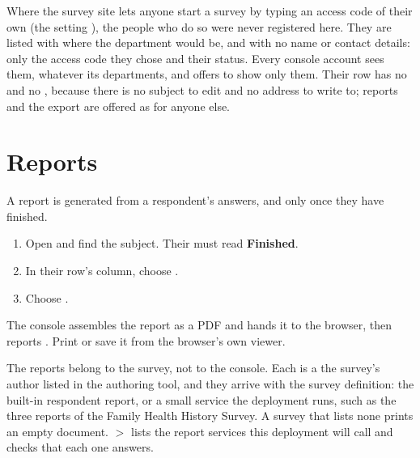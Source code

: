 \documentclass[11pt, a4paper]{article}
\begin{document}
Where the survey site lets anyone start a survey by typing an access code of their own (the
setting ), the people who do so were never registered here. They
are listed with  where the department would be, and with no name or contact
details: only the access code they chose and their status. Every console account sees them,
whatever its departments, and  offers  to show only them.
Their row has no  and no , because there is no subject to edit and no
address to write to; reports and the export are offered as for anyone else.

\section{Reports}
\label{sec:reports}

A report is generated from a respondent's answers, and only once they have finished.

\begin{enumerate}
  \item Open  and find the subject. Their  must read
        \textbf{Finished}.
  \item In their row's  column, choose .
  \item Choose .
\end{enumerate}


The console assembles the report as a PDF and hands it to the browser, then reports . Print or save it from the browser's own viewer.

\begin{elicitnote}
The reports belong to the survey, not to the console. Each is a  the
survey's author listed in the authoring tool, and they arrive with the survey definition: the
built-in respondent report, or a small service the deployment runs, such as the three reports
of the Family Health History Survey. A survey that lists none prints an empty document.
 $>$  lists the report services this deployment will call and checks
that each one answers.
\end{elicitnote}
\end{document}
